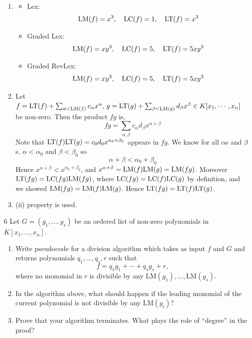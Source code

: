 \documentclass[Notebook.tex]{subfiles}
\begin{document}
\begin{solution}
    \bbni
    \begin{enumerate}[label=(\alph*),ref=\theenumi\alph*]
        \item 
        \begin{itemize}
            \item Lex: \[\text{LM}(f) = x^3, \quad \text{LC}(f) = 1, \quad \text{LT}(f) = x^3\]
            \item Graded Lex: \[\text{LM}(f) = xy^3, \quad \text{LC}(f) = 5, \quad \text{LT}(f) = 5xy^3\]
            \item Graded RevLex: \[\text{LM}(f) = xy^3, \quad \text{LC}(f) = 5, \quad \text{LT}(f) = 5xy^3\]
        \end{itemize}

        \item Let $f = \text{LT}(f) + \sum_{\alpha < \text{LM}(f)} c_\alpha x^\alpha, \, g = \text{LT}(g) + \sum_{\beta < \text{LM}(g)} d_\beta x^\beta \in K[x_1, \cdots, x_n]$ be non-zero. Then the product $fg$ is, 
        \[fg = \sum_{\alpha, \beta} c_\alpha d_\beta x^{\alpha+\beta}\]
        Note that $\text{LT}(f)\text{LT}(g) = c_0d_0 x^{\alpha_0 + \beta_0}$ appears in $fg$. We know for all $\alpha$s and $\beta$s, $\alpha < \alpha_0$ and $\beta < \beta_0$ so
        \[\alpha + \beta < \alpha_0 + \beta_0\]
        Hence $x^{\alpha + \beta} < x^{\alpha_0 + \beta_0}$, and $x^{\alpha+\beta} = \text{LM}(f) \text{LM}(g) =  \text{LM}(fg)$. Moreover $\text{LT}(fg) = \text{LC}(fg) \text{LM}(fg)$, where $\text{LC}(fg) = \text{LC}(f) \text{LC}(g)$ by definition, and we showed $\text{LM}(fg) =  \text{LM}(f) \text{LM}(g)$. Hence $\text{LT}(fg) = \text{LT}(f) \text{LT}(g)$. 

        \item (ii) property is used. 
    \end{enumerate}
\end{solution}

\newpage 

\begin{problem}{6}
    Let $G = (g_1, \dots, g_s)$ be an ordered list of non-zero polynomials in $K[x_1, \dots, x_n]$.

    \begin{enumerate}[label=(\alph*),ref=\theenumi\alph*]
        \item Write pseudocode for a division algorithm which takes as input $f$ and $G$ and returns polynomials $q_1, \dots, q_s, r$ such that
        \[
        f = q_1 g_1 + \cdots + q_s g_s + r,
        \]
        where no monomial in $r$ is divisible by any $\mathrm{LM}(g_1), \dots, \mathrm{LM}(g_s)$.
        \item In the algorithm above, what should happen if the leading monomial of the current polynomial is not divisible by any $\mathrm{LM}(g_i)$?
        \item Prove that your algorithm terminates. What plays the role of “degree” in the proof?
    \end{enumerate}
\end{problem}
\end{document}
